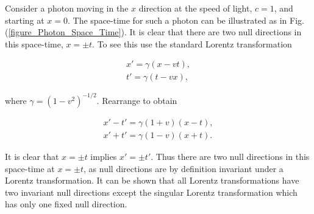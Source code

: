 Consider a photon moving in the $x$ direction at the speed of light, $c = 1$, and starting at $x = 0$. The space-time for such a photon can be illustrated as in Fig.(\ref{figure_Photon_Space_Time}). It is clear that there are two null directions in this space-time, $x = \pm t$. To see this use the standard Lorentz transformation

\begin{align*}
x'  = \gamma (x - vt),  \\
t'  = \gamma (t - vx),
\end{align*}

\noindent where $\gamma = {(1 - v^2)}^{-1/2}$. Rearrange to obtain

\begin{eqnarray*}
x' - t' = \gamma (1 + v) (x - t), \\
x' + t' = \gamma (1 - v) (x + t).
\end{eqnarray*}

\noindent It is clear that $x = \pm t$ implies $x' = \pm t'$. Thus there are two null directions in this space-time at $x = \pm t$, as null directions are by definition invariant under a Lorentz transformation. It can be shown that all Lorentz transformations have two invariant null directions except the singular Lorentz transformation which has only one fixed null direction.  
